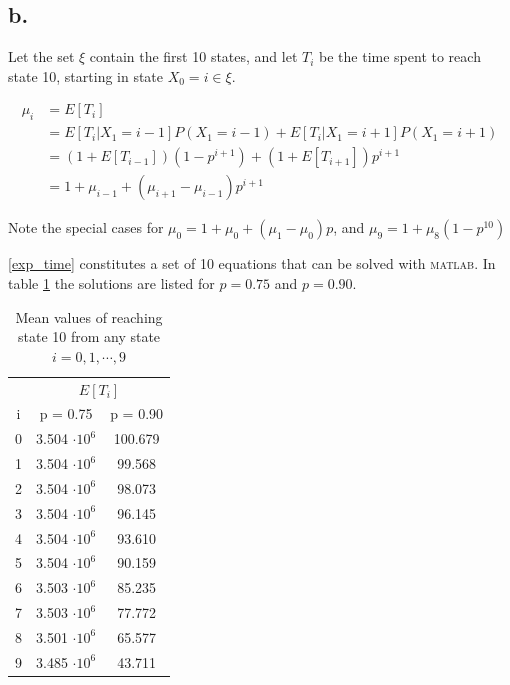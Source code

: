 \subsection*{b.}

Let the set $\xi$ contain the first 10 states, and let $T_i$ be the time spent to reach state 10, starting in state $X_0 = i \in \xi$. 


\begin{equation}
\label{exp_time}
\begin{aligned}
 \mu_i &= E[T_i] \\
       &= E[T_{i}|X_1 = i-1]P(X_1=i-1) + E[T_{i}|X_1 = i+1]P(X_1=i+1) \\
       &= ( 1+E[T_{i-1}] )( 1-p^{i+1} ) + ( 1+E[T_{i+1}] )p^{i+1} \\
       &= 1 + \mu_{i-1} + ( \mu_{i+1} - \mu_{i-1} )p^{i+1}
\end{aligned}
\end{equation}

Note the special cases for $\mu_0 = 1 + \mu_0 + (\mu_1 - \mu_0)p$, and $\mu_9 = 1 + \mu_8(1-p^{10})$

\cref{exp_time} constitutes a set of 10 equations that can be solved with \textsc{matlab}. 
In table \cref{mean_to_ten} the solutions are listed for $p=0.75$ and $p=0.90$. 

\begin{table}[!htbp]
\centering
\begin{tabular}{ccc}
  \hline
  \noalign{\smallskip}
   & \multicolumn{2}{c}{$E[T_i]$} \\
  i & p = 0.75 & p = 0.90 \\
  \hline
  \noalign{\smallskip}
  0   & 3.504 $\cdot 10^6$ & 100.679 \\
  1   & 3.504 $\cdot 10^6$ & 99.568 \\
  2   & 3.504 $\cdot 10^6$ & 98.073 \\
  3   & 3.504 $\cdot 10^6$ & 96.145 \\
  4   & 3.504 $\cdot 10^6$ & 93.610 \\
  5   & 3.504 $\cdot 10^6$ & 90.159 \\
  6   & 3.503 $\cdot 10^6$ & 85.235 \\
  7   & 3.503 $\cdot 10^6$ & 77.772 \\
  8   & 3.501 $\cdot 10^6$ & 65.577 \\
  9   & 3.485 $\cdot 10^6$ & 43.711 \\
\hline
\end{tabular}
\caption{Mean values of reaching state 10 from any state $i=0,1,\cdots, 9$}
\label{mean_to_ten}
\end{table}


